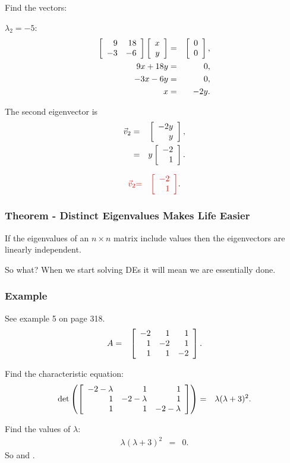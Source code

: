\begin{frame}
  Find the vectors:

  $\lambda_2 = -5$:
  \begin{eqnarray*}
    \left[ \begin{array}{rr} 9 & 18 \\ -3 & -6 \end{array} \right] \left[ \begin{array}{r} x \\ y \end{array} \right] & = & \left[ \begin{array}{r} 0 \\ 0 \end{array} \right], \\
    9x + 18y & = & 0, \\
    -3x - 6y & = & 0, \\
    x & = & -2 y.
  \end{eqnarray*}

  The second eigenvector is 
  \begin{eqnarray*}
    \vec{v}_2 & = & \left[ \begin{array}{r} -2y \\ y \end{array} \right], \\
    & = & y \left[ \begin{array}{r} -2 \\ 1 \end{array} \right].
  \end{eqnarray*}

  \begin{eqnarray*}
    {\color{red}\vec{v}_2} & {\color{red}=} & {\color{red}\left[ \begin{array}{r} -2 \\ 1 \end{array} \right]}.
  \end{eqnarray*}

\end{frame}



\begin{frame}
  \frametitle{Theorem - Distinct Eigenvalues Makes Life Easier}

  \begin{theorem}
    If the eigenvalues of an $n\times n$ matrix include 
     values then the eigenvectors are linearly
    independent.
  \end{theorem}


  \vfill

  {
    So what? When we start solving DEs it will mean we are essentially
    done. 
  }

  \vfill

\end{frame}



\begin{frame}
  \frametitle{Example}

  See example 5 on page 318.
  \begin{eqnarray*}
    A & = & \left[ \begin{array}{rrr} -2 & 1 & 1 \\ 1 & -2 & 1 \\ 1 & 1 & -2 \end{array} \right].
  \end{eqnarray*}

  {
    Find the characteristic equation:
    \begin{eqnarray*}
      \det\left(\left[ \begin{array}{rrr} -2-\lambda & 1 & 1 \\ 1 & -2-\lambda & 1 \\ 1 & 1 & -2-\lambda \end{array} \right]\right)
      & = & \lambda (\lambda+3)^2.
    \end{eqnarray*}

    Find the values of $\lambda$:
    \begin{eqnarray*}
      \lambda (\lambda+3)^2 & = & 0.
    \end{eqnarray*}
    So  and .
  }

\end{frame}



